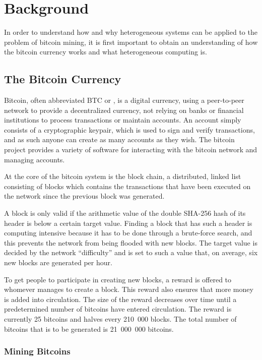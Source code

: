\chapter{Background}
\label{cha:background}

In order to understand how and why heterogeneous systems can be applied to the problem of
bitcoin mining, it is first important to obtain an understanding of how the bitcoin currency
works and what heterogeneous computing is.

\section{The Bitcoin Currency}
\label{sec:bitcoins}
Bitcoin, often abbreviated BTC or \bitcoin, is a digital currency, using a peer-to-peer network to provide
a decentralized currency, not relying on banks or financial institutions to process transactions
or maintain accounts. An account simply consists of a cryptographic keypair, which is used to sign
and verify transactions, and as such anyone can create as many accounts as they wish. The bitcoin
project provides a variety of software for interacting with the bitcoin network and managing
accounts.

At the core of the bitcoin system is the block chain, a distributed, linked list consisting of blocks
which contains the transactions that have been executed on the network since the previous block was
generated.

A block is only valid if the arithmetic value of the double SHA-256 hash of its header is below
a certain target value. Finding a block that has such a header is computing intensive because it
has to be done through a brute-force search, and this prevents the network from being flooded with
new blocks. The target value is decided by the network ``difficulty'' and is set to such a value
that, on average, six new blocks are generated per hour.


To get people to participate in creating new blocks, a reward is offered to whomever manages to
create a block. This reward also ensures that more money is added into circulation. The size of
the reward decreases over time until a predetermined number of bitcoins have entered circulation.
The reward is currently 25 bitcoins and halves every 210~000 blocks. The total number of bitcoins
that is to be generated is 21~000~000 bitcoins. \cite{bitcoin}

\subsection{Mining Bitcoins}
\label{sec:bitcoin-mining}

